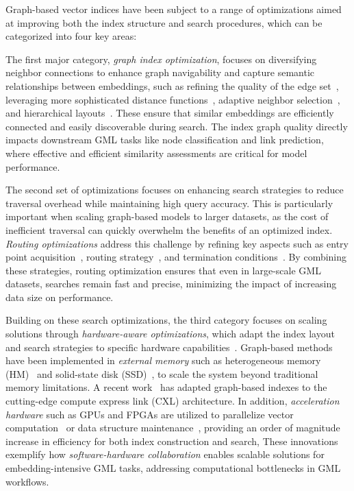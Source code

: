 \documentclass{sig-alternate-10pt}
\begin{document}
Graph-based vector indices have been subject to a range of optimizations aimed at improving both the index structure and search procedures, which can be categorized into four key areas:

The first major category, {\em graph index optimization}, focuses on diversifying neighbor connections to enhance graph navigability and capture semantic relationships between embeddings, such as refining the quality of the edge set~\cite{FXWC19}, leveraging more sophisticated distance functions~\cite{DML11}, adaptive neighbor selection~\cite{peng2023efficient}, and hierarchical layouts~\cite{MYD18HNSW}.
These ensure that similar embeddings are efficiently connected and easily discoverable during search.
The index graph quality directly impacts downstream GML tasks like node classification and link prediction, where effective and efficient similarity assessments are critical for model performance.

The second set of optimizations focuses on enhancing search strategies to reduce traversal overhead while maintaining high query accuracy. This is particularly important when scaling graph-based models to larger datasets, as the cost of inefficient traversal can quickly overwhelm the benefits of an optimized index.
{\em Routing optimizations} address this challenge by refining key aspects such as entry point acquisition~\cite{lu2021hvs, zhao2023towards}, routing strategy~\cite{gao2023high, yue2023routing, LXI24Pro, yue2023routing}, and termination conditions~\cite{li2020improving, zhang2023vbase}.
By combining these strategies, routing optimization ensures that even in large-scale GML datasets, searches remain fast and precise, minimizing the impact of increasing data size on performance.

Building on these search optimizations, the third category focuses on scaling solutions through {\em hardware-aware optimizations}, which adapt the index layout and search strategies to specific hardware capabilities~\cite{WXYWPKGXGX24}.
Graph-based methods have been implemented in {\em external memory} such as heterogeneous memory (HM)~\cite{ren2020hm} and solid-state disk (SSD)~\cite{jayaram2019diskann}, to scale the system beyond traditional memory limitations.
A recent work~\cite{jang2023cxl} has adapted graph-based indexes to the cutting-edge compute express link (CXL) architecture.
In addition, {\em acceleration hardware} such as GPUs and FPGAs are utilized to parallelize vector computation~\cite{zhao2020song, ootomo2024cagra, manohar2024parlayann} or data structure maintenance~\cite{yu2022gpu}, providing an order of magnitude increase in efficiency for both index construction and search,
These innovations exemplify how {\em software-hardware collaboration} enables scalable solutions for embedding-intensive GML tasks, addressing computational bottlenecks in GML workflows.
\end{document}
